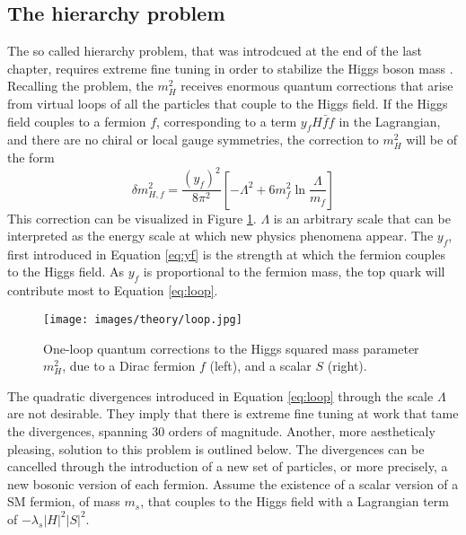 \subsection*{The hierarchy problem}
\noindent\justify
The so called hierarchy problem, that was introdcued at the end of the last chapter, requires extreme fine tuning in order to stabilize the Higgs boson mass \cite{Martin:1997ns}. 
Recalling the problem, the $m_{H}^{2}$ receives enormous quantum corrections that arise from virtual loops of all the particles that couple to the Higgs field. 
If the Higgs field couples to a fermion $f$, corresponding to a term $y_{f}H\bar{f}f$ in the Lagrangian, and there are no chiral or local gauge symmetries, the correction to $m_{H}^{2}$ will be of the form
\begin{equation}
\delta m_{H,f}^{2}=\frac{(y_{f})^{2}}{8\pi^{2}}\left[-\Lambda^{2} +6m_{f}^{2}\ln\frac{\Lambda}{m_{f}}\right]
\label{eq:loop}
\end{equation}                                                                                                
This correction can be visualized in Figure \ref{fig:loop}.
$\Lambda$ is an arbitrary scale that can be interpreted as the energy scale at which new physics phenomena appear. 
The $y_{f}$, first introduced in Equation \ref{eq:yf} is the strength at which the fermion couples to the Higgs field. 
As $y_{f}$ is proportional to the fermion mass, the top quark will contribute most to Equation \ref{eq:loop}.
\begin{figure}[htbp!]
\begin{center}
    \texttt{[image: images/theory/loop.jpg]}
\caption{One-loop quantum corrections to the Higgs squared mass parameter $m_H^2$, due to a Dirac fermion $f$ (left), and a scalar $S$ (right).}
\label{fig:loop}
\end{center}
\end{figure}                                     
The quadratic divergences introduced in Equation \ref{eq:loop} through the scale $\Lambda$ are not desirable. 
They imply that there is extreme fine tuning at work that tame the divergences, spanning 30 orders of magnitude.
Another, more aestheticaly pleasing, solution to this problem is outlined below.    
The divergences can be cancelled through the introduction of a new set of particles, or more precisely, a new bosonic version of each fermion. 
Assume the existence of a scalar version of a SM fermion, of mass $m_{s}$, that couples to the Higgs field with a Lagrangian term of $-\lambda_{s}|H|^{2}|S|^{2}$. 
